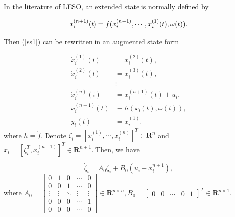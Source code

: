 \documentclass[english]{cccconf}
\begin{document}
In the literature of LESO, an extended state is normally defined by \cite{Huang2017}

\begin{equation}
  \label{ss2}
   x_i^{(n+1)}(t) = f(x_i^{(n-1)},\cdots, x_i^{(1)}(t),\omega(t)).\\
\end{equation}

Then (\ref{ss1}) can be rewritten in an augmented state form

\begin{equation}
  \label{ss3}
  \begin{aligned}
  \dot x_i^{(1)}(t) &= x_i^{(2)}(t),\\
  \dot x_i^{(2)}(t) &= x_i^{(3)}(t),\\
  & \vdots \\
  \dot x_i^{(n)}(t) &= x_i^{(n+1)}(t)+u_i,\\
  \dot x_i^{(n+1)}(t) &= h(x_i(t),\omega(t)),\\
  y_i(t) &= x_i^{(1)},
  \end{aligned}
\end{equation}where $h=\dot f$. 
Denote $\zeta_i = \left[ x_i^{(1)},\cdots, x_i^{(n)} \right]^T \in \mathbf R^n$ and $x_i=\left[ \zeta_i^{T},x_i^{(n+1)} \right]^T \in \mathbf R^{n+1}$. Then, we have

\begin{equation}
  \label{ss4}
  \dot \zeta_i = A_0  \zeta_i + B_0 (u_i +  x_i^{n+1}),
  \end{equation}where $A_{0}=\begin{bmatrix} 0 & 1 & 0 & \cdots & 0\\ 0 & 0 & 1 & \cdots & 0\\ \vdots & \vdots & \ddots & \vdots & \vdots \\ 0 & 0 & 0 & \cdots & 1\\ 0 & 0 & 0 & \cdots & 0 \end{bmatrix} \in \mathbf R^{n \times n}, B_{0}=\begin{bmatrix} 0 & 0 & \cdots & 0 & 1\end{bmatrix} ^T \in \mathbf R^{n \times 1}$.
\end{document}
